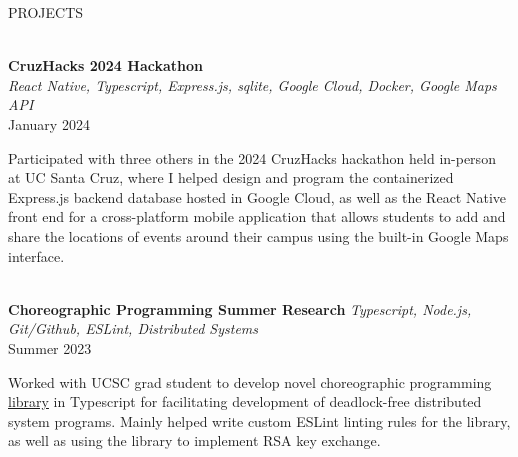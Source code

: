 \documentclass[letterpaper,10pt]{article}
\begin{document}
\begin{multicols*}{2}
  \begin{LARGE} \faTools\hspace{5px} PROJECTS \end{LARGE}
  \vspace{.5em} \\
  {
  \fontsize{11pt}{\baselineskip}\selectfont
  \textbf{CruzHacks 2024 Hackathon}
  }
  \\
  \textit{React Native, Typescript, Express.js, sqlite, Google Cloud, Docker, Google Maps API} \\
  January 2024
  \vspace{5px} \\
  \begin{minipage}{.5\textwidth}
    \begin{flushleft}
      Participated with three others in the 2024 CruzHacks hackathon held in-person at UC Santa Cruz, where I helped design and program the containerized Express.js backend database hosted in Google Cloud, as well as the React Native front end for a cross-platform mobile application that allows students to add and share the locations of events around their campus using the built-in Google Maps interface.
    \end{flushleft}
  \end{minipage}
  \vspace{.5em} \\
  {
  \fontsize{10.5pt}{\baselineskip}\selectfont
  \textbf{Choreographic Programming Summer Research}
  }
  \textit{Typescript, Node.js, Git/Github, ESLint, Distributed Systems} \\
  Summer 2023
  \vspace{5px} \\
  \begin{minipage}{.5\textwidth}
    \begin{flushleft}
      Worked with UCSC grad student to develop novel choreographic programming \href{https://github.com/ImpregnableProgrammer/choreography-ts-RK-work}{library} in Typescript for facilitating development of deadlock-free distributed system programs. Mainly helped write custom ESLint linting rules for the library, as well as using the library to implement RSA key exchange.
    \end{flushleft}
  \end{minipage}
  \columnbreak \\
  \vspace{1em} \\

\end{multicols*}
\end{document}
